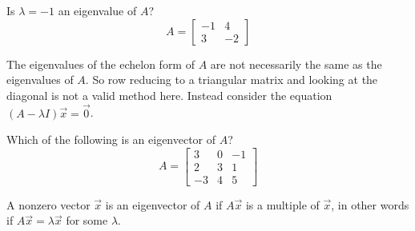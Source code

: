 \documentclass{ximera}
\begin{document}
  	  		       \begin{question} Is $\lambda = -1$ an eigenvalue of $A$?
  	  		       	$$A = \begin{bmatrix} -1&4\\ 3& -2\end{bmatrix}$$
  	  		       	
  	  		       \begin{multipleChoice}
  	  		  \end{multipleChoice}
  	  		       	
  	  		       	\begin{hint}
  	  		       	The eigenvalues of the echelon form of $A$ are not necessarily the same as the eigenvalues of $A$. So row reducing to a triangular matrix and looking at the diagonal is not a valid method here. Instead consider the equation $(A-\lambda I)\vec{x} =\vec{0}$.
  	  		       		\end{hint}
  	  		       	
  	  		       \end{question}	
  	  		        \begin{question} Which of the following is an eigenvector of $A$?
  	  		        	$$A = \begin{bmatrix} 3&0&-1\\ 2&3& 1\\-3&4&5\end{bmatrix}$$
  	  		        	
  	  		        	\begin{multipleChoice}
  	  		        		\choice{$\vec{x}=\begin{bmatrix} 2\\4\\1\end{bmatrix}$}
  	  		        		\choice[correct]{$\vec{x}=\begin{bmatrix} 2\\2\\-2\end{bmatrix}$}
  	  		        	\end{multipleChoice}
  	  		        	
  	  		        	\begin{hint}
  	  		        		A nonzero vector $\vec{x}$ is an eigenvector of $A$ if $A\vec{x}$ is a multiple of $\vec{x}$, in other words if $A\vec{x} =\lambda\vec{x}$ for some $\lambda$.
  	  		        	\end{hint}
  	  		        	
  	  		        \end{question}	
\end{document}
